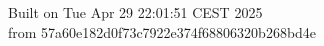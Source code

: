 {\noindent Built on Tue Apr 29 22:01:51 CEST 2025} \\ 
 {\noindent from 57a60e182d0f73c7922e374f68806320b268bd4e}
